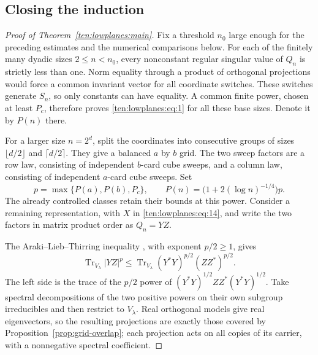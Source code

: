 \subsection{Closing the induction}
\begin{proof}[Proof of Theorem~\ref{ten:lowplanes:main}]
Fix a threshold $n_0$ large enough for the preceding estimates and the numerical comparisons below. For each of the finitely many dyadic sizes $2\le n<n_0$, every nonconstant regular singular value of $Q_n$ is strictly less than one. Norm equality through a product of orthogonal projections would force a common invariant vector for all coordinate switches. These switches generate $S_n$, so only constants can have equality. A common finite power, chosen at least $P_c$, therefore proves \eqref{ten:lowplanes:eq:1} for all these base sizes. Denote it by $P(n)$ there.

For a larger size $n=2^d$, split the coordinates into consecutive groups of sizes $\lfloor d/2\rfloor$ and $\lceil d/2\rceil$. They give a balanced $a$ by $b$ grid. The two sweep factors are a row law, consisting of independent $b$-card cube sweeps, and a column law, consisting of independent $a$-card cube sweeps. Set
\[
 p=\max\{P(a),P(b),P_c\},\qquad
 P(n)=\bigl(1+2(\log n)^{-1/4}\bigr)p.
\]
The already controlled classes retain their bounds at this power. Consider a remaining representation, with $X$ in \eqref{ten:lowplanes:eq:14}, and write the two factors in matrix product order as $Q_n=YZ$.

The Araki--Lieb--Thirring inequality \cite{araki1990,audenaert2007}, with exponent $p/2\ge1$, gives
\begin{equation}
 \operatorname{Tr}_{V_\lambda}|YZ|^p
 \le\operatorname{Tr}_{V_\lambda}
       (Y^*Y)^{p/2}(ZZ^*)^{p/2}.
 \label{ten:lowplanes:eq:22}
\end{equation}
The left side is the trace of the $p/2$ power of
$(Y^*Y)^{1/2}ZZ^*(Y^*Y)^{1/2}$.
Take spectral decompositions of the two positive powers on their own subgroup irreducibles and then restrict to $V_\lambda$. Real orthogonal models give real eigenvectors, so the resulting projections are exactly those covered by Proposition~\ref{prop:grid-overlap}; each projection acts on all copies of its carrier, with a nonnegative spectral coefficient.


\end{proof}
